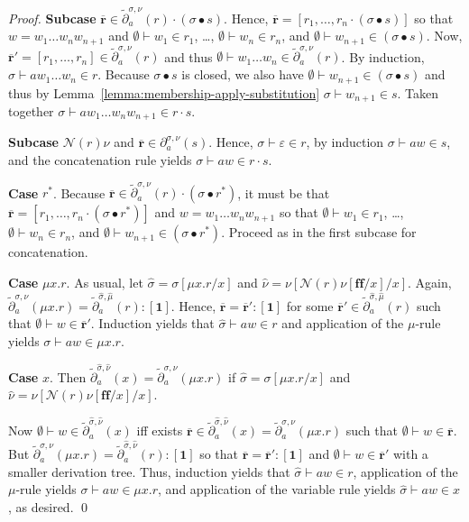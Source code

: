 \documentclass[runningheads, envcountsame, a4paper]{llncs}
\newcommand{\False}{\ensuremath{\mathbf{ff}}}%
\newcommand\pderiv[3][{}]{\partial^{#1}_{#3}(#2)}
\newcommand\cderiv[3][{}]{\tilde\partial^{#1}_{#3}(#2)}
\newcommand\Rnull{\mathbf0}
\newcommand\Rempty{\mathbf1}
\newcommand\PUSH{:}
\newcommand\SINGLETON[1]{{[#1]}}
\newcommand\Null{\mathcal{N}}
\newcommand\RS{\ensuremath{\overline{\mathbf{r}}}}
\newcommand\ApplySubst[2]{#1 \bullet #2} %
\begin{document}
\begin{proof}
  \textbf{Subcase }$\RS \in \cderiv[\sigma,\nu]{r}{a}\cdot
  (\ApplySubst\sigma s)$. Hence, $\RS = [r_1, \dots, r_n \cdot 
  (\ApplySubst\sigma s)]$ so that $w= w_1\dots w_nw_{n+1}$ and $\emptyset
  \vdash w_1 \in r_1$, \dots, $\emptyset \vdash w_n \in r_n$, and
  $\emptyset \vdash w_{n+1} \in(\ApplySubst\sigma s)$.
  Now, $\RS' = [r_1,\dots, r_n] \in \cderiv[\sigma,\nu]{r}{a}$ and thus
  $\emptyset \vdash w_1\dots w_n \in \cderiv[\sigma,\nu]{r}{a}$. By
  induction, $\sigma \vdash aw_1\dots w_n \in r$. Because
  $\ApplySubst\sigma s$ is closed, we also have $\emptyset \vdash
  w_{n+1} \in(\ApplySubst\sigma s)$ and thus by
  Lemma~\ref{lemma:membership-apply-substitution} $\sigma \vdash
  w_{n+1} \in s$. Taken together $\sigma \vdash aw_1\dots w_nw_{n+1}
  \in r\cdot s$.

  \textbf{Subcase }$\Null(r)\nu$ and $\RS \in
  \pderiv[\sigma,\nu]{s}{a}$. Hence, $\sigma \vdash \varepsilon \in
  r$, by induction $\sigma \vdash aw\in s$, and the concatenation rule yields
  $\sigma \vdash aw \in r\cdot s$.
  

  \textbf{Case }$r^*$. Because $\RS \in \cderiv[\sigma,\nu]{r}{a}
  \cdot(\ApplySubst\sigma {r^*})$, it must be that $\RS = [r_1,\dots,
  r_n\cdot(\ApplySubst\sigma {r^*})]$ and $w=w_1\dots w_nw_{n+1}$ so
  that  $\emptyset
  \vdash w_1 \in r_1$, \dots, $\emptyset \vdash w_n \in r_n$, and
  $\emptyset \vdash w_{n+1} \in(\ApplySubst\sigma {r^*})$. Proceed as in
  the first subcase for concatenation.

  \textbf{Case }$\mu x.r$. As usual, let $\hat\sigma = \sigma{[\mu
    x.r/x]}$ and $\hat\nu = \nu{[\Null (r)\nu[\False/x]/x]}$. Again,
  $\cderiv[\sigma,\nu]{\mu x.r}a = \cderiv[\hat\sigma,\hat\mu]{r}a
  \PUSH \SINGLETON\Rempty$.
  Hence, $\RS = \RS' \PUSH \SINGLETON\Rempty$ for some $\RS' \in
  \cderiv[\hat\sigma,\hat\mu]{r}{a}$ such that $\emptyset \vdash w \in
  \RS'$. Induction yields that $\hat\sigma \vdash aw \in r$ and
  application of the $\mu$-rule yields $\sigma \vdash aw \in \mu x.r$.

  \textbf{Case }$x$. Then $\cderiv[\hat\sigma,\hat\nu]xa =
  \cderiv[\sigma,\nu]{\mu x.r}a$ if $\hat\sigma = \sigma{[\mu
    x.r/x]}$ and $\hat\nu = \nu{[\Null (r)\nu[\False/x]/x]}$.

  Now $\emptyset \vdash w \in \cderiv[\hat\sigma,\hat\nu]xa$ iff
  exists $\RS \in \cderiv[\hat\sigma,\hat\nu]xa =
  \cderiv[\sigma,\nu]{\mu x.r}a$ such that $\emptyset \vdash w \in
  \RS$. But $\cderiv[\sigma,\nu]{\mu x.r}a =
  \cderiv[\hat\sigma,\hat\nu]{r}a \PUSH \SINGLETON\Rempty$ so that
  $\RS = \RS'\PUSH\SINGLETON\Rempty$ and $\emptyset \vdash w \in \RS'$
  with a smaller derivation tree. Thus, induction yields that
  $\hat\sigma \vdash aw \in r$, application of the $\mu$-rule yields
  $\sigma \vdash aw \in \mu x.r$, and application of the variable rule
  yields $\hat\sigma \vdash aw \in x$, as desired.
  \qed
\end{proof}
\end{document}
